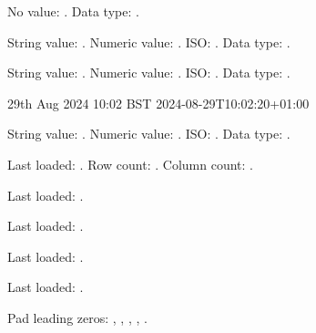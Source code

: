 \documentclass{article}
\begin{document}
No value: \dtlnovalue. Data type: \DTLdatumtype{\dtlnovalue}.

\DTLparse{}%
String value: \mydatum. Numeric value: \DTLdatumvalue{\mydatum}.
{\renewcommand\DTLtemporalvalue[2]{#2}ISO: \DTLdatumvalue{\mydatum}}.
Data type: \DTLdatumtype{\mydatum}.

\DTLparse{}%
String value: \mydatum. Numeric value: \DTLdatumvalue{\mydatum}.
{\renewcommand\DTLtemporalvalue[2]{#2}ISO: \DTLdatumvalue{\mydatum}}.
Data type: \DTLdatumtype{\mydatum}.

\DTLsettemporaldatum{\mydatum}
 {29th Aug 2024 10:02 BST}
 {2024-08-29T10:02:20+01:00}

String value: \mydatum. Numeric value: \DTLdatumvalue{\mydatum}.
{\renewcommand\DTLtemporalvalue[2]{#2}ISO: \DTLdatumvalue{\mydatum}}.
Data type: \DTLdatumtype{\mydatum}.


Last loaded: \dtllastloadeddb.
Row count: .
Column count: .


Last loaded: \dtllastloadeddb.


Last loaded: \dtllastloadeddb.


Last loaded: \dtllastloadeddb.


Last loaded: \dtllastloadeddb.





Pad leading zeros: ,
, ,
, .






\end{document}
